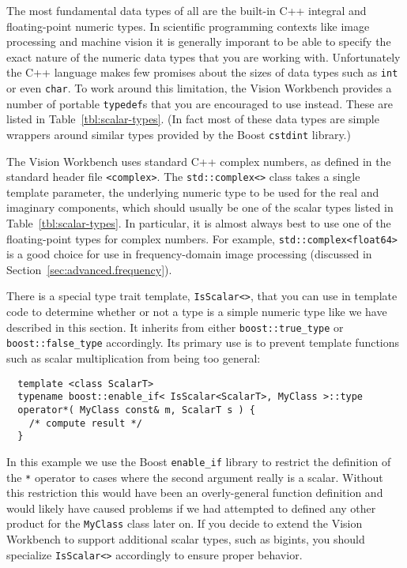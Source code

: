 The most fundamental data types of all are the built-in C++ integral
and floating-point numeric types.  In scientific programming contexts 
like image processing and machine vision it is generally imporant to 
be able to specify the exact nature of the numeric data types that you 
are working with.  Unfortunately the C++ language makes few promises 
about the sizes of data types such as \verb#int# or even \verb#char#.  
To work around this limitation, the Vision Workbench provides a number 
of portable \verb#typedef#s that you are encouraged to use instead.  
These are listed in Table~\ref{tbl:scalar-types}.  (In fact most of 
these data types are simple wrappers around similar types provided 
by the Boost \verb#cstdint# library.)

The Vision Workbench uses standard C++ complex numbers, as defined 
in the standard header file \verb#<complex>#.  The \verb#std::complex<># 
class takes a single template parameter, the underlying numeric type 
to be used for the real and imaginary components, which should usually 
be one of the scalar types listed in Table~\ref{tbl:scalar-types}. 
In particular, it is almost always best to use one of the floating-point 
types for complex numbers.  For example, \verb#std::complex<float64># 
is a good choice for use in frequency-domain image processing 
(discussed in Section~\ref{sec:advanced.frequency}).

There is a special type trait template, \verb#IsScalar<>#, that you 
can use in template code to determine whether or not a type is a 
simple numeric type like we have described in this section.  It 
inherits from either \verb#boost::true_type# or \verb#boost::false_type# 
accordingly.  Its primary use is to prevent template functions such 
as scalar multiplication from being too general:
\begin{verbatim}
  template <class ScalarT>
  typename boost::enable_if< IsScalar<ScalarT>, MyClass >::type
  operator*( MyClass const& m, ScalarT s ) {
    /* compute result */
  }
\end{verbatim}
In this example we use the Boost \verb#enable_if# library to restrict 
the definition of the \verb#*# operator to cases where the second 
argument really is a scalar.  Without this restriction this would 
have been an overly-general function definition and would likely 
have caused problems if we had attempted to defined any other  
product for the \verb#MyClass# class later on.  If you decide to 
extend the Vision Workbench to support additional scalar types, 
such as bigints, you should specialize \verb#IsScalar<># accordingly 
to ensure proper behavior.

